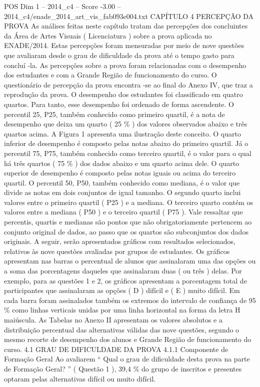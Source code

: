 \begin{textsample}{POS Dim 1 – 2014\_c4 – Score -3.00 – 2014\_c4/enade\_2014\_art\_vis\_fab093e004.txt}  \label{ex:f1_pos_319}
CAPÍTULO 4 PERCEPÇÃO DA PROVA As análises feitas neste capítulo tratam das percepções dos concluintes da Área de Artes Visuais ( Licenciatura ) sobre a prova aplicada no ENADE/2014.
Estas percepções foram mensuradas por meio de nove questões que avaliaram desde o grau de dificuldade da prova até o tempo gasto para concluí -la.
As percepções sobre a prova foram relacionadas com o desempenho dos estudantes e com a Grande Região de funcionamento do curso.
O questionário de percepção da prova encontra -se ao final do Anexo IV, que traz a reprodução da prova.
O desempenho dos estudantes foi classificado em quatro quartos.
Para tanto, esse desempenho foi ordenado de forma ascendente.
O percentil 25, P25, também conhecido como primeiro quartil, é a nota de desempenho que deixa um quarto ( 25 \% ) dos valores observados abaixo e três quartos acima.
A Figura 1 apresenta uma ilustração deste conceito.
O quarto inferior de desempenho é composto pelas notas abaixo do primeiro quartil.
Já o percentil 75, P75, também conhecido como terceiro quartil, é o valor para o qual há três quartos ( 75 \% ) dos dados abaixo e um quarto acima dele.
O quarto superior de desempenho é composto pelas notas iguais ou acima do terceiro quartil.
O percentil 50, P50, também conhecido como mediana, é o valor que divide as notas em dois conjuntos de igual tamanho.
O segundo quarto inclui valores entre o primeiro quartil ( P25 ) e a mediana.
O terceiro quarto contém os valores entre a mediana ( P50 ) e o terceiro quartil ( P75 ).
Vale ressaltar que percentis, quartis e medianas são pontos que não obrigatoriamente pertencem ao conjunto original de dados, ao passo que os quartos são subconjuntos dos dados originais.
A seguir, serão apresentados gráficos com resultados selecionados, relativos às nove questões avaliadas por grupos de estudantes.
Os gráficos apresentam nas barras o percentual de alunos que assinalaram uma das opções ou a soma das porcentagens daqueles que assinalaram duas ( ou três ) delas.
Por exemplo, para as questões 1 e 2, os gráficos apresentam a porcentagem total de participantes que assinalaram as opções ( D ) difícil e ( E ) muito difícil.
Em cada barra foram assinalados também os extremos do intervalo de confiança de 95 \% como linhas verticais unidas por uma linha horizontal na forma da letra H maiúscula.
As Tabelas no Anexo II apresentam os valores absolutos e a distribuição percentual das alternativas válidas das nove questões, segundo o mesmo recorte de desempenho dos alunos e Grande Região de funcionamento do curso. 4.1 GRAU DE DIFICULDADE DA PROVA 4.1.1 Componente de Formação Geral Ao avaliarem “ Qual o grau de dificuldade desta prova na parte de Formação Geral? ” ( Questão 1 ), 39,4 \% do grupo de inscritos e presentes optaram pelas alternativas difícil ou muito difícil.

\end{textsample}
